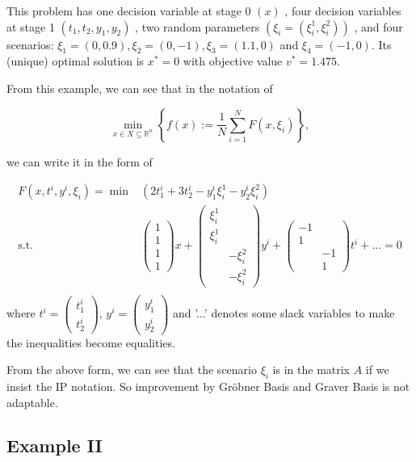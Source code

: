 \documentclass{article}
\theoremstyle{plain}
\theoremstyle{definition}
\begin{document}
\begin{propsition}
This problem has one decision variable at stage  0 $(x)$ , four decision variables at stage  1 $\left(t_{1}, t_{2}, y_{1}, y_{2}\right)$ , two random parameters  $\left(\xi_{i}=\left(\xi_{i}^{1}, \xi_{i}^{2}\right)\right)$ , and four scenarios:  $\xi_{1}=(0,0.9), \xi_{2}=(0,-1), \xi_{3}=(1.1,0)$  and  $\xi_{4}=(-1,0)$. Its (unique) optimal solution is  $x^{*}=0$  with objective value  $v^{*}=1.475$.

From this example, we can see that in the notation of 

$$
\min _{x \in X \subseteq \mathbb{R}^{n}}\left\{f(x):=\frac{1}{N} \sum_{i=1}^{N} F\left(x, \xi_{i}\right)\right\},
$$

we can write it in the form of

\begin{align*}
 F(x,t^i,y^i,\xi_i)=\min &\left(2 t_{1}^{i}+3 t_{2}^{i}-y_{1}^{i} \xi_{i}^{1}-y_{2}^{i} \xi_{i}^{2}\right) \\
\text{s.t. }  &\begin{pmatrix} 1 \\ 1 \\ 1 \\  1\end{pmatrix} x + \begin{pmatrix} \xi_i^1  &   \\ \xi_i^1 &  \\ & -\xi_i^2 \\  & -\xi_i^2\end{pmatrix}  y^i + \begin{pmatrix} -1 &  \\ 1 & \\ & -1 \\ & 1\end{pmatrix}t^i +...=0\\
\end{align*}
where $t^i=\begin{pmatrix} t_1^i \\ t_2^i \end{pmatrix}$, $y^i=\begin{pmatrix} y_1^i\\ y_2^i \end{pmatrix}$ and  '...' denotes some slack variables to make the inequalities become equalities.

From the above form, we can see that the scenario $\xi_i$ is in the matrix $A$ if we insist the IP notation. So  improvement by  Gröbner Basis and Graver Basis is not adaptable.

\subsection{Example II}


\end{propsition}
\end{document}
